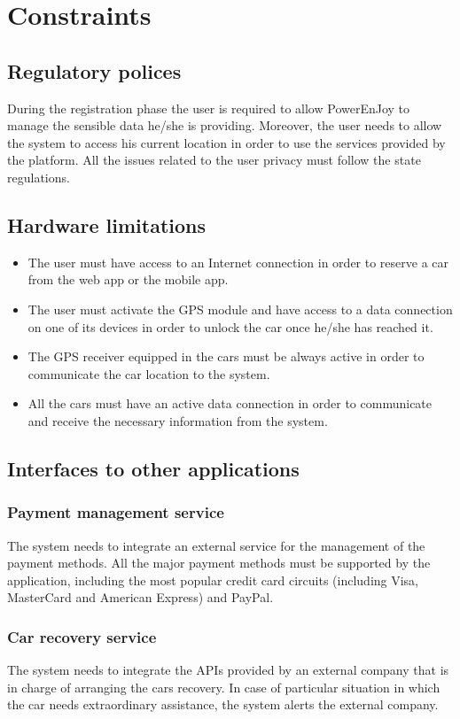 \section{Constraints}
\subsection{Regulatory polices}
During the registration phase the user is required to allow PowerEnJoy to manage the sensible data he/she is providing. Moreover, the user needs to allow the system to access his current location in order to use the services provided by the platform. All the issues related to the user privacy must follow the state regulations.

\subsection{Hardware limitations}
\begin{itemize}
	\item The user must have access to an Internet connection in order to reserve a car from the web app or the mobile app.
	\item The user must activate the GPS module and have access to a data connection on one of its devices in order to unlock the car once he/she has reached it.
	\item The GPS receiver equipped in the cars must be always active in order to communicate the car location to the system.
	\item All the cars must have an active data connection in order to communicate and receive the necessary information from the system.
\end{itemize}

\subsection{Interfaces to other applications}
\subsubsection{Payment management service}
The system needs to integrate an external service for the management of the payment methods. All the major payment methods must be supported by the application, including the most popular credit card circuits (including Visa, MasterCard and American Express) and PayPal.

\subsubsection{Car recovery service}
The system needs to integrate the APIs provided by an external company that is in charge of arranging the cars recovery. In case of particular situation in which the car needs extraordinary assistance, the system alerts the external company.